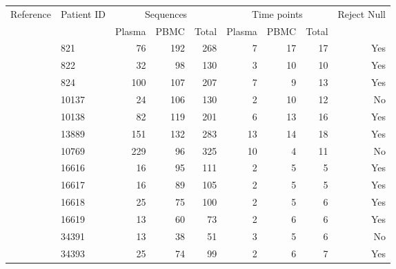 \documentclass[12pt]{article}
\begin{document}
\begin{table}[!ht]
\def\arraystretch{1.3}%
\begin{center}
\begin{tabular}{llrrrrrrr} 

Reference & Patient ID & \multicolumn{3}{c}{Sequences} & \multicolumn{3}{c}{Time points} & Reject Null \\ 
 &  & Plasma & PBMC & Total & Plasma & PBMC & Total\\
\hline
\cite{Shankarappa99}%
& 821 &      76 &      192 &      268 &        7 &       17 &       17 &   Yes \\ 
& 822 &      32 &       98 &      130 &        3 &       10 &       10 &   Yes \\ 
& 824 &     100 &      107 &      207 &        7 &        9 &       13 &   Yes \\ 
& 10137 &     24 &      106 &      130 &        2 &       10 &       12 &   No \\ 
& 10138 &     82 &      119 &      201 &        6 &       13 &       16 &   Yes \\
& 13889 &    151 &      132 &      283 &       13 &       14 &       18 &   Yes \\ 
 \cite{Fischer04} & 10769 &    229 &       96 &      325 &       10 &        4 &       11 &   No \\ 
\cite{Llewellyn06} & 16616 &     16 &       95 &      111 &        2 &        5 &        5 &    Yes  \\ 
& 16617 &     16 &       89 &      105 &        2 &        5 &        5 &   Yes \\ 
& 16618 &     25 &       75 &      100 &        2 &        5 &        6 &   Yes \\ 
& 16619 &     13 &       60 &       73 &        2 &        6 &        6 &   Yes \\ 
\cite{Novitsky09}%
& 34391 &     13 &       38 &       51 &        3 &        5 &        6 &   No \\ 
& 34393 &     25 &       74 &       99 &        2 &        6 &        7 &   Yes  \\ 

\end{tabular}
\end{center}
\end{table}
\end{document}
